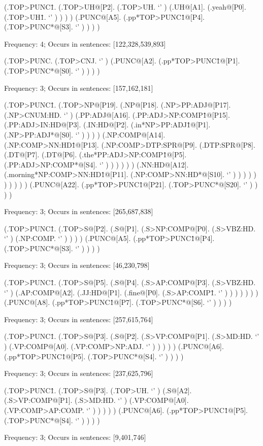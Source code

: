 \documentclass[10pt]{article}
\begin{document}
\begin{parsetree} (.TOP>PUNC\^1. (.TOP>UH@[P2]. (.TOP>UH. `' ) (.UH@[A1]. (.yeah@[P0]. (.TOP>UH\^1. `' ) ) ) ) (.PUNC@[A5]. (.pp*TOP>PUNC\^1@[P4]. (.TOP>PUNC*@[S3]. `' ) ) ) ) \end{parsetree}

Frequency: 4; Occurs in sentences: [122,328,539,893]


\begin{parsetree} (.TOP>PUNC. (.TOP>CNJ. `' ) (.PUNC@[A2]. (.pp*TOP>PUNC\^1@[P1]. (.TOP>PUNC*@[S0]. `' ) ) ) ) \end{parsetree}

Frequency: 3; Occurs in sentences: [157,162,181]


\begin{parsetree} (.TOP>PUNC\^1. (.TOP>NP@[P19]. (.NP@[P18]. (.NP>PP:ADJ@[P17]. (.NP>CNUM:HD. `' ) (.PP:ADJ@[A16]. (.PP:ADJ>NP:COMP\^1@[P15]. (.PP:ADJ>IN:HD@[P3]. (.IN:HD@[P2]. (.in*NP>PP:ADJ\^1@[P1]. (.NP>PP:ADJ*@[S0]. `' ) ) ) ) (.NP:COMP@[A14]. (.NP:COMP>NN:HD\^1@[P13]. (.NP:COMP>DTP:SPR@[P9]. (.DTP:SPR@[P8]. (.DT@[P7]. (.DT@[P6]. (.the*PP:ADJ>NP:COMP\^1@[P5]. (.PP:ADJ>NP:COMP*@[S4]. `' ) ) ) ) ) ) (.NN:HD@[A12]. (.morning*NP:COMP>NN:HD\^1@[P11]. (.NP:COMP>NN:HD*@[S10]. `' ) ) ) ) ) ) ) ) ) ) (.PUNC@[A22]. (.pp*TOP>PUNC\^1@[P21]. (.TOP>PUNC*@[S20]. `' ) ) ) ) \end{parsetree}

Frequency: 3; Occurs in sentences: [265,687,838]


\begin{parsetree} (.TOP>PUNC\^1. (.TOP>S@[P2]. (.S@[P1]. (.S>NP:COMP@[P0]. (.S>VBZ:HD. `' ) (.NP:COMP. `' ) ) ) ) (.PUNC@[A5]. (.pp*TOP>PUNC\^1@[P4]. (.TOP>PUNC*@[S3]. `' ) ) ) ) \end{parsetree}

Frequency: 3; Occurs in sentences: [46,230,798]


\begin{parsetree} (.TOP>PUNC\^1. (.TOP>S@[P5]. (.S@[P4]. (.S>AP:COMP@[P3]. (.S>VBZ:HD. `' ) (.AP:COMP@[A2]. (.JJ:HD@[P1]. (.fine@[P0]. (.S>AP:COMP\^1. `' ) ) ) ) ) ) ) (.PUNC@[A8]. (.pp*TOP>PUNC\^1@[P7]. (.TOP>PUNC*@[S6]. `' ) ) ) ) \end{parsetree}

Frequency: 3; Occurs in sentences: [257,615,764]


\begin{parsetree} (.TOP>PUNC\^1. (.TOP>S@[P3]. (.S@[P2]. (.S>VP:COMP@[P1]. (.S>MD:HD. `' ) (.VP:COMP@[A0]. (.VP:COMP>NP:ADJ. `' ) ) ) ) ) (.PUNC@[A6]. (.pp*TOP>PUNC\^1@[P5]. (.TOP>PUNC*@[S4]. `' ) ) ) ) \end{parsetree}

Frequency: 3; Occurs in sentences: [237,625,796]


\begin{parsetree} (.TOP>PUNC\^1. (.TOP>S@[P3]. (.TOP>UH. `' ) (.S@[A2]. (.S>VP:COMP@[P1]. (.S>MD:HD. `' ) (.VP:COMP@[A0]. (.VP:COMP>AP:COMP. `' ) ) ) ) ) (.PUNC@[A6]. (.pp*TOP>PUNC\^1@[P5]. (.TOP>PUNC*@[S4]. `' ) ) ) ) \end{parsetree}

Frequency: 3; Occurs in sentences: [9,401,746]
\end{document}
